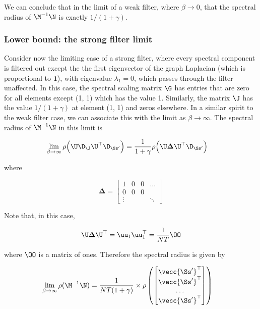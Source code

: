 We can conclude that in the limit of a weak filter, where $\beta \rightarrow 0$, that the spectral radius of $\M^{-1}\N$ is exactly  $1 / (1 + \gamma)$. 



\subsubsection{Lower bound: the strong filter limit}

Consider now the limiting case of a strong filter, where every spectral component is filtered out except the the first eigenvector of the graph Laplacian (which is proportional to $\mathbf{1}$), with eigenvalue $\lambda_1 = 0$, which passes through the filter unaffected. In this case, the spectral scaling matrix $\G$ has entries that are zero for all elements except (1, 1) which has the value 1. Similarly, the matrix $\J$ has the value $1 / (1 + \gamma)$ at element (1, 1) and zeros elsewhere. In a similar spirit to the weak filter case, we can associate this with the limit as $\beta \rightarrow \infty$.  The spectral radius of $\M^{-1}\N$ in this limit is 

\begin{align*}
    \lim_{\beta \rightarrow \infty} \rho\Big(\U \D_\J \U^\top \D_{\Ss'} \Big) &= \frac{1}{1 + \gamma} \rho\Big(\U \mathbf{\Delta} \U^\top \D_{\Ss'} \Big)
\end{align*}

where 

$$
\mathbf{\Delta} = \begin{bmatrix}
    1 & 0 & 0 & \dots \\
    0 & 0 & 0 &  \\
    \vdots & & & \ddots
\end{bmatrix} 
$$

Note that, in this case, 

\begin{equation*}
    \U \mathbf{\Delta} \U^\top = \uu_1 \uu_1^\top  = \frac{1}{NT} \OO
\end{equation*}

where $ \OO$ is a matrix of ones. Therefore the spectral radius is given by 

\begin{align*}
    \lim_{\beta \rightarrow \infty} \rho(\M^{-1}\N) &= \frac{1}{NT (1 + \gamma) } \times \rho \left( \begin{bmatrix}
        \vecc{\Ss'}^\top \\ \vecc{\Ss'}^\top \\ \dots \\ \vecc{\Ss'}^\top
    \end{bmatrix} \right)
\end{align*}

